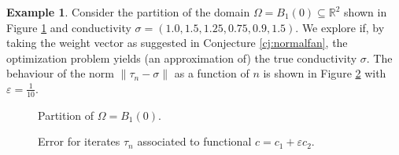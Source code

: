 \documentclass{article}
\theoremstyle{definition}
\newtheorem{example}[theorem]{Example}
\theoremstyle{remark}
\renewcommand{\epsilon}{\varepsilon}
\begin{document}
\begin{example}
Consider the partition of the domain $\Omega = B_1(0)\subseteq \mathbb R^2$ shown in Figure \ref{fig:partition} and conductivity $\sigma = (1.0,1.5,1.25,0.75,0.9,1.5)$.
We explore if, by taking the weight vector as suggested in Conjecture \ref{cj:normalfan}, the optimization problem yields (an approximation of) the true conductivity $\sigma$.
The behaviour of the norm $\|\tau_n-\sigma\|$ as a function of $n$ is shown in Figure \ref{fig:normalfanerror} with $\epsilon = \frac1{10}$.
\begin{figure}[H]
\centering
{}
\caption{Partition of $\Omega = B_1(0)$.}
\label{fig:partition}
\end{figure}

\begin{figure}[H]
\centering

\caption{Error for iterates $\tau_n$ associated to functional $c = c_1+\epsilon c_2$.}
\label{fig:normalfanerror}
\end{figure}
\end{example}
\end{document}

